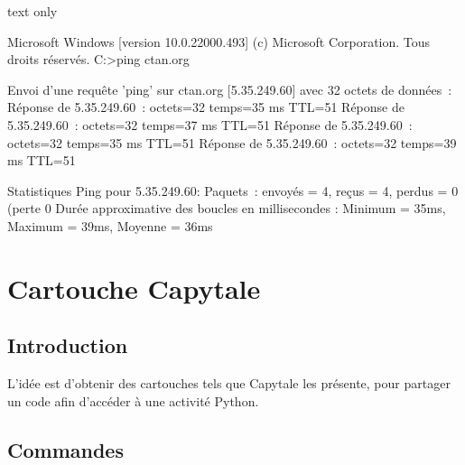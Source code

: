 \documentclass[a4paper,french,11pt]{article}
\begin{document}
\begin{PresCodeSortiePL}{text only}
\begin{TerminalWin}[15cm]{}
Microsoft Windows [version 10.0.22000.493]
(c) Microsoft Corporation. Tous droits réservés.
C:\Users\test>ping ctan.org

Envoi d'une requête 'ping' sur ctan.org [5.35.249.60] avec 32 octets de données :
Réponse de 5.35.249.60 : octets=32 temps=35 ms TTL=51
Réponse de 5.35.249.60 : octets=32 temps=37 ms TTL=51
Réponse de 5.35.249.60 : octets=32 temps=35 ms TTL=51
Réponse de 5.35.249.60 : octets=32 temps=39 ms TTL=51

Statistiques Ping pour 5.35.249.60:
Paquets : envoyés = 4, reçus = 4, perdus = 0 (perte 0%
Durée approximative des boucles en millisecondes :
Minimum = 35ms, Maximum = 39ms, Moyenne = 36ms
\end{TerminalWin}


\end{PresCodeSortiePL}

\newpage

\section{Cartouche Capytale}\label{capytale}

\subsection{Introduction}

\begin{tipblock}
L'idée est d'obtenir des \textsf{cartouches} tels que \textsf{Capytale} les présente, pour partager un code afin d'accéder à une activité \textsf{Python}.
\end{tipblock}

\subsection{Commandes}
\end{document}
